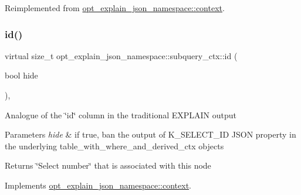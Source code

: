 Reimplemented from \mbox{\hyperlink{classopt__explain__json__namespace_1_1context_a73e34a665c4550ba7725839ca643119d}{opt\+\_\+explain\+\_\+json\+\_\+namespace\+::context}}.

\mbox{\label{classopt__explain__json__namespace_1_1subquery__ctx_abfd5e54f4399b5b4269573895c84a0dc}} 
\subsubsection{\texorpdfstring{id()}{id()}}
{\footnotesize\ttfamily virtual size\+\_\+t opt\+\_\+explain\+\_\+json\+\_\+namespace\+::subquery\+\_\+ctx\+::id (\begin{DoxyParamCaption}\item[{bool}]{hide }\end{DoxyParamCaption})\hspace{0.3cm}{\ttfamily [inline]}, {\ttfamily [virtual]}}

Analogue of the \char`\"{}id\char`\"{} column in the traditional E\+X\+P\+L\+A\+IN output


\begin{DoxyParams}{Parameters}
{\em hide} & if true, ban the output of K\+\_\+\+S\+E\+L\+E\+C\+T\+\_\+\+ID J\+S\+ON property in the underlying table\+\_\+with\+\_\+where\+\_\+and\+\_\+derived\+\_\+ctx objects\\
\hline
\end{DoxyParams}
\begin{DoxyReturn}{Returns}
\char`\"{}\+Select number\char`\"{} that is associated with this node 
\end{DoxyReturn}


Implements \mbox{\hyperlink{classopt__explain__json__namespace_1_1context_a07c46bab31a35d88c13ccdca82755aaa}{opt\+\_\+explain\+\_\+json\+\_\+namespace\+::context}}.

\mbox{\label{classopt__explain__json__namespace_1_1subquery__ctx_aa096e69d58d2c6a241e66619bd23f891}} 
